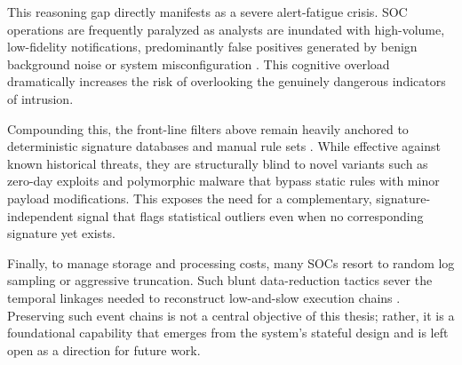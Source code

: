 This reasoning gap directly manifests as a severe alert-fatigue crisis. SOC operations are frequently paralyzed as analysts are inundated with high-volume, low-fidelity notifications, predominantly false positives generated by benign background noise or system misconfiguration \cite{alertfatigue2022}. This cognitive overload dramatically increases the risk of overlooking the genuinely dangerous indicators of intrusion.

Compounding this, the front-line filters above remain heavily anchored to deterministic signature databases and manual rule sets \cite{nist80061}. While effective against known historical threats, they are structurally blind to novel variants such as zero-day exploits and polymorphic malware that bypass static rules with minor payload modifications. This exposes the need for a complementary, signature-independent signal that flags statistical outliers even when no corresponding signature yet exists.

Finally, to manage storage and processing costs, many SOCs resort to random log sampling or aggressive truncation. Such blunt data-reduction tactics sever the temporal linkages needed to reconstruct low-and-slow execution chains \cite{apt_stealth2021}. Preserving such event chains is not a central objective of this thesis; rather, it is a foundational capability that emerges from the system's stateful design and is left open as a direction for future work.

